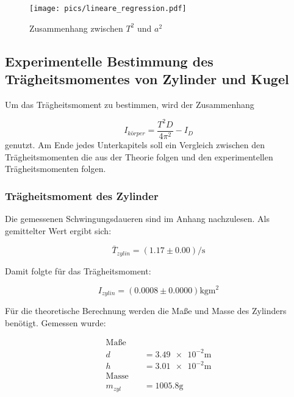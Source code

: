 \begin{figure}
  \centering
  \texttt{[image: pics/lineare\_regression.pdf]}
  \caption{Zusammenhang zwischen $T^2$ und $a^2$}
  \label{fig:zusammenhang_a_T}
\end{figure}


\subsection{Experimentelle Bestimmung des Trägheitsmomentes von Zylinder und Kugel}

Um das Trägheitsmoment zu bestimmen, wird der Zusammenhang

\begin{equation*}
I_{körper}=\frac{T^2 D}{4\pi^2}-I_D
\end{equation*}
genutzt.
Am Ende jedes Unterkapitels soll ein Vergleich zwischen den
Trägheitsmomenten die aus der Theorie folgen und den
experimentellen Trägheitsmomenten folgen. %

\subsubsection{Trägheitsmoment des Zylinder}

Die gemessenen Schwingungsdaueren sind im Anhang nachzulesen.
Als gemittelter Wert ergibt sich:

\begin{equation*}
\bar{T}_{zylin}=\left(\num{1.17}\pm\num{0.00}\right) \si{\per\second}
\end{equation*}

Damit folgte für das Trägheitsmoment:

\begin{equation}
\label{eq:traeg_zylinder_grau_exp}
I_{zylin}=\left(\num{0.0008}\pm\num{0.0000}\right) \si{\kilogram\meter\squared}
\end{equation}

Für die theoretische Berechnung werden die Maße und Masse des Zylinders benötigt.
Gemessen wurde:

\begin{align*}
\text{Maße} \quad &\\
d&=\num{3.49e-2}\si{\meter}\\
h&=\num{3.01e-2}\si{\meter}\\
\text{Masse} \quad &\\
m_{zyl}&=\num{1005.8}\si{\gram}
\end{align*}

